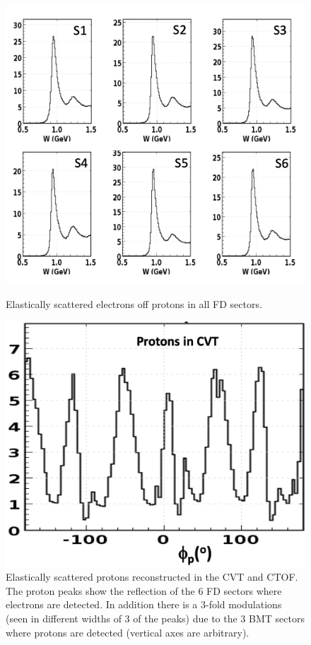 \documentclass[final,3p,twocolumn]{elsarticle}
\begin{document}
\begin{figure}[t!]
\centerline{\includegraphics[width=0.9\columnwidth]{elastic-electrons.png}}
\caption{ Elastically scattered electrons off protons in all FD sectors.}
\label{elastic-electrons}
\vspace{0.3cm}\centerline{\includegraphics[width=0.8\columnwidth]{CVT-elastic-protons.png}}
\caption{Elastically scattered protons reconstructed in the CVT and CTOF. The proton peaks show the reflection of the 6 FD sectors 
where electrons are detected. In addition there is a 3-fold modulations (seen in different widths of 3 of the peaks) due to the 3 BMT sectors where protons are detected (vertical axes are arbitrary). }
\label{CVT-elastic protons}
\end{figure}
\end{document}
